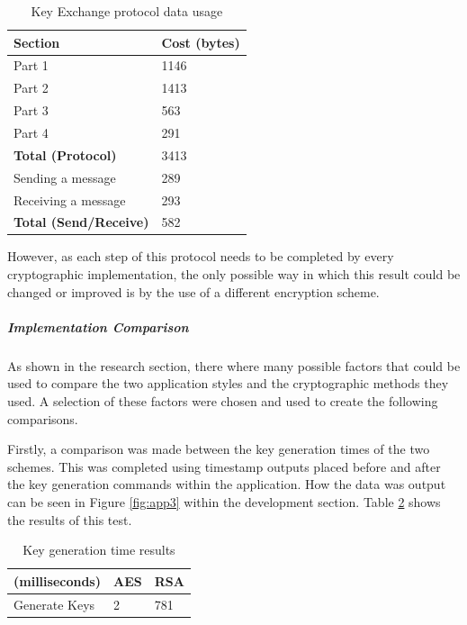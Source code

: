 \documentclass[a4paper,12pt]{report}
\begin{document}
\begin{table}[htb]
\begin{center}
    \begin{tabular}{| l | l | }
    \hline
    \textbf{Section} & \textbf{Cost (bytes)}\\ \hline
    Part 1 & 1146 \\ \hline
    Part 2 & 1413 \\ \hline
    Part 3 & 563 \\ \hline
    Part 4 & 291 \\ \hline
    \textbf{Total (Protocol)} & 3413 \\ \hline
    Sending a message & 289 \\ \hline
    Receiving a message & 293 \\ \hline
    \textbf{Total (Send/Receive)} & 582 \\
    \hline
    \end{tabular}
   \caption{Key Exchange protocol data usage}
    \label{tab:keyexdata}
\end{center}
\end{table}

However, as each step of this protocol needs to be completed by every cryptographic implementation, the only possible way in which this result could be changed or improved is by the use of a different encryption scheme. 

\subparagraph{Implementation Comparison}

As shown in the research section, there where many possible factors that could be used to compare the two application styles and the cryptographic methods they used. A selection of these factors were chosen and used to create the following comparisons.  

Firstly, a comparison was made between the key generation times of the two schemes. This was completed using timestamp outputs placed before and after the key generation commands within the application. How the data was output can be seen in Figure \ref{fig:app3} within the development section. Table \ref{tab:keygen} shows the results of this test. 

\begin{table}[htb]
\begin{center}
    \begin{tabular}{| l | l | l | }
    \hline
    (milliseconds) & \textbf{AES} & \textbf{RSA}\\ \hline
    Generate Keys & 2 & 781 \\
    \hline
    \end{tabular}
   \caption{Key generation time results}
    \label{tab:keygen}
\end{center}
\end{table}
\end{document}
